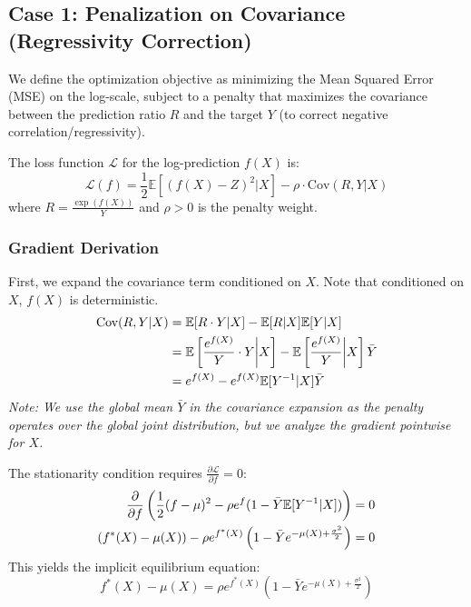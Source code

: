 \documentclass[11pt]{article}
\theoremstyle{plain}
\theoremstyle{definition}
\newcommand{\1}{\mathbf{1}}
\begin{document}
\subsection{Case 1: Penalization on Covariance (Regressivity Correction)}

We define the optimization objective as minimizing the Mean Squared Error (MSE) on the log-scale, subject to a penalty that maximizes the covariance between the prediction ratio $R$ and the target $Y$ (to correct negative correlation/regressivity).

The loss function $\mathcal{L}$ for the log-prediction $f(X)$ is:
\begin{equation}
    \mathcal{L}(f) = \frac{1}{2}\mathbb{E}[(f(X) - Z)^2 | X] - \rho \cdot \text{Cov}(R, Y | X)
\end{equation}
where $R = \frac{\exp(f(X))}{Y}$ and $\rho > 0$ is the penalty weight.

\subsubsection{Gradient Derivation}
First, we expand the covariance term conditioned on $X$. Note that conditioned on $X$, $f(X)$ is deterministic.
\begin{align}
    \text{Cov}(R, Y | X) &= \mathbb{E}[R \cdot Y | X] - \mathbb{E}[R | X]\mathbb{E}[Y | X] \notag \\
    &= \mathbb{E}\left[ \frac{e^{f(X)}}{Y} \cdot Y \bigg| X \right] - \mathbb{E}\left[ \frac{e^{f(X)}}{Y} \bigg| X \right] \bar{Y} \notag \\
    &= e^{f(X)} - e^{f(X)}\mathbb{E}[Y^{-1} | X] \bar{Y}
\end{align}
\textit{Note: We use the global mean $\bar{Y}$ in the covariance expansion as the penalty operates over the global joint distribution, but we analyze the gradient pointwise for $X$.}

The stationarity condition requires $\frac{\partial \mathcal{L}}{\partial f} = 0$:
\begin{align}
    \frac{\partial}{\partial f} \left( \frac{1}{2}(f - \mu)^2 - \rho e^f (1 - \bar{Y}\mathbb{E}[Y^{-1}|X]) \right) &= 0 \notag \\
    (f^*(X) - \mu(X)) - \rho e^{f^*(X)} \left( 1 - \bar{Y} e^{-\mu(X) + \frac{\sigma^2}{2}} \right) &= 0
\end{align}
This yields the implicit equilibrium equation:
\begin{equation} \label{eq:implicit}
    f^*(X) - \mu(X) = \rho e^{f^*(X)} \left( 1 - \bar{Y} e^{-\mu(X) + \frac{\sigma^2}{2}} \right)
\end{equation}
\end{document}
